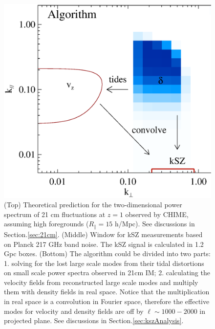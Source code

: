 \begin{figure}[tbp]
\begin{minipage}[t]{\linewidth}
\includegraphics[width=\textwidth]{figure/demo_convolution.eps}
\vspace{-0.6cm}
\end{minipage}
\caption{
(Top) Theoretical prediction for the two-dimensional power spectrum of 21 cm fluctuations at $z=1$ observed by CHIME, assuming high foregrounds ($R_\parallel=15$ h/Mpc). See discussions in Section.\ref{sec:21cm}. (Middle) Window for kSZ measurements based on Planck 217 GHz band noise. The kSZ signal is calculated in 1.2 Gpc boxes.
(Bottom) The algorithm could be divided into two parts: 1. solving for the lost large scale modes 
from their tidal distortions on small scale power spectra observed in 21cm IM; 
2. calculating the velocity fields from reconstructed large scale modes 
and multiply them with density fields in real space.  
Notice that the multiplication in real space is a convolution in Fourier space, 
therefore the effective modes for velocity and density fields are off by $\ell\sim1000-2000$ in projected plane. 
See discussions in Section.\ref{sec:kszAnalysis}. 
}
\end{figure}
